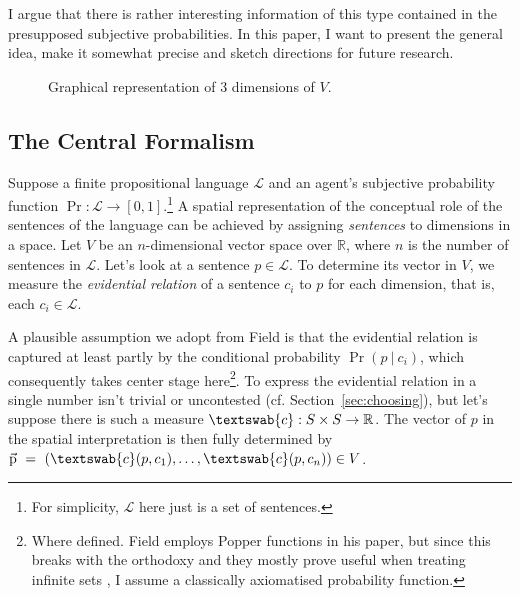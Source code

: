 \documentclass[11pt, a4paper]{scrartcl}
\renewcommand{\i}[1]{\emph{#1}}
\renewcommand{\L}{\mathcal{L}}
\renewcommand{\v}[1]{\vec{\mathrm{#1}}}
\newcommand{\m}[1]{\textswab{#1}}
\newcommand{\given}[1][]{\:#1\vert\:}
\begin{document}
I argue that there is rather interesting information of this type contained in the presupposed subjective probabilities. In this paper, I want to present the general idea, make it somewhat precise and sketch directions for future research.

\begin{figure}
    \centering
{}
\caption{Graphical representation of 3 dimensions of $V$.}
\end{figure}

\subsection{The Central Formalism}\label{sec:central}

Suppose a finite propositional language $\L$ and an agent's subjective probability function $\Pr: \L \rightarrow [0,1]$.\footnote{For simplicity, $\L$ here just is a set of sentences.} A spatial representation of the conceptual role of the sentences of the language can be achieved by assigning \i{sentences} to dimensions in a space. Let $V$ be an $n$-dimensional vector space over $\mathbb{R}$, where $n$ is the number of sentences in $\L$. Let's look at a sentence $p \in \L$. To determine its vector in $V$, we measure the \i{evidential relation} of a sentence $c_i$ to $p$ for each dimension, that is, each $c_i \in \L$. 

A plausible assumption we adopt from Field is that the evidential relation is captured at least partly by the conditional probability $\Pr(p \given c_i)$, which consequently takes center stage here\footnote{Where defined. Field employs Popper functions in his paper, but since this breaks with the orthodoxy and they mostly prove useful when treating infinite sets \parencite[1352]{Leitgeb2013-LEIRBS}, I assume a classically axiomatised probability function.}. To express the evidential relation in a single number isn't trivial or uncontested (cf. Section~\ref{sec:choosing}), but let's suppose there is such a measure ${\m{c}: S \times S \rightarrow \mathbb{R}}$. The vector of $p$ in the spatial interpretation is then fully determined by $\v{p}~=~(\m{c}({p, c_1}),\dots, \m{c}(p, c_n)) \in V$.
\end{document}
